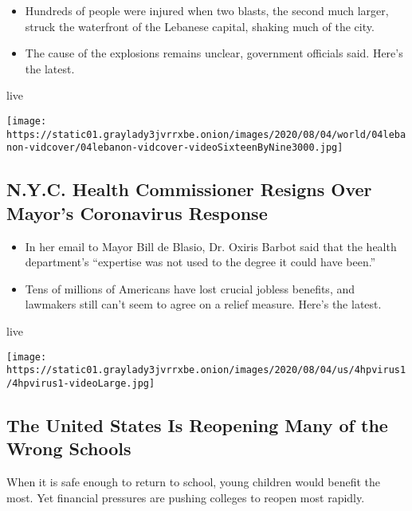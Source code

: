 \begin{itemize}
\tightlist
\item
  Hundreds of people were injured when two blasts, the second much
  larger, struck the waterfront of the Lebanese capital, shaking much of
  the city.
\item
  The cause of the explosions remains unclear, government officials
  said. Here's the latest.
\end{itemize}

live

\texttt{[image: https://static01.graylady3jvrrxbe.onion/images/2020/08/04/world/04lebanon-vidcover/04lebanon-vidcover-videoSixteenByNine3000.jpg]}

\href{/2020/08/04/world/coronavirus-cases.html}{}

\hypertarget{nyc-health-commissioner-resigns-over-mayors-coronavirus-response}{%
\subsection{N.Y.C. Health Commissioner Resigns Over Mayor's Coronavirus
Response}\label{nyc-health-commissioner-resigns-over-mayors-coronavirus-response}}

\begin{itemize}
\tightlist
\item
  In her email to Mayor Bill de Blasio, Dr. Oxiris Barbot said that the
  health department's ``expertise was not used to the degree it could
  have been.''
\item
  Tens of millions of Americans have lost crucial jobless benefits, and
  lawmakers still can't seem to agree on a relief measure. Here's the
  latest.
\end{itemize}

live

\texttt{[image: https://static01.graylady3jvrrxbe.onion/images/2020/08/04/us/4hpvirus1/4hpvirus1-videoLarge.jpg]}

\href{/2020/08/03/business/how-schools-reopen.html}{}

\hypertarget{the-united-states-is-reopening-many-of-the-wrong-schools}{%
\subsection{The United States Is Reopening Many of the Wrong
Schools}\label{the-united-states-is-reopening-many-of-the-wrong-schools}}

When it is safe enough to return to school, young children would benefit
the most. Yet financial pressures are pushing colleges to reopen most
rapidly.

